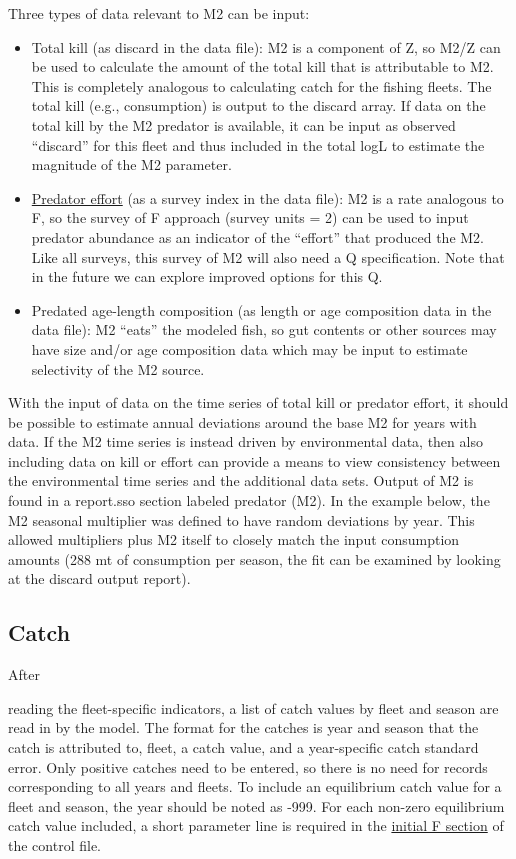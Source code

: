 Three types of data relevant to M2 can be input:

\begin{itemize}
	\item Total kill (as discard in the data file): M2 is a component of Z, so M2/Z can be used to calculate the amount of the total kill that is attributable to M2. This is completely analogous to calculating catch for the fishing fleets. The total kill (e.g., consumption) is output to the discard array. If data on the total kill by the M2 predator is available, it can be input as observed ``discard'' for this fleet and thus included in the total logL to estimate the magnitude of the M2 parameter.
	
	\item \hyperlink{PredEffort}{Predator effort} (as a survey index in the data file): M2 is a rate analogous to F, so the survey of F approach (survey units = 2) can be used to input predator abundance as an indicator of the ``effort'' that produced the M2. Like all surveys, this survey of M2 will also need a Q specification. Note that in the future we can explore improved options for this Q.
	
	\item Predated age-length composition (as length or age composition data in the data file): M2 ``eats'' the modeled fish, so gut contents or other sources may have size and/or age composition data which may be input to estimate selectivity of the M2 source. 
\end{itemize}

With the input of data on the time series of total kill or predator effort, it should be possible to estimate annual deviations around the base M2 for years with data. If the M2 time series is instead driven by environmental data, then also including data on kill or effort can provide a means to view consistency between the environmental time series and the additional data sets. Output of M2 is found in a report.sso section labeled predator (M2). In the example below, the M2 seasonal multiplier was defined to have random deviations by year. This allowed multipliers plus M2 itself to closely match the input consumption amounts (288 mt of consumption per season, the fit can be examined by looking at the discard output report).


\subsection{Catch}
\hypertarget{CatchFormat}{After} reading the fleet-specific indicators, a list of catch values by fleet and season are read in by the model. The format for the catches is year and season that the catch is attributed to, fleet, a catch value, and a year-specific catch standard error. Only positive catches need to be entered, so there is no need for records corresponding to all years and fleets. To include an equilibrium catch value for a fleet and season, the year should be noted as -999. For each non-zero equilibrium catch value included, a short parameter line is required in the \hyperlink{InitF}{initial F section} of the control file.

